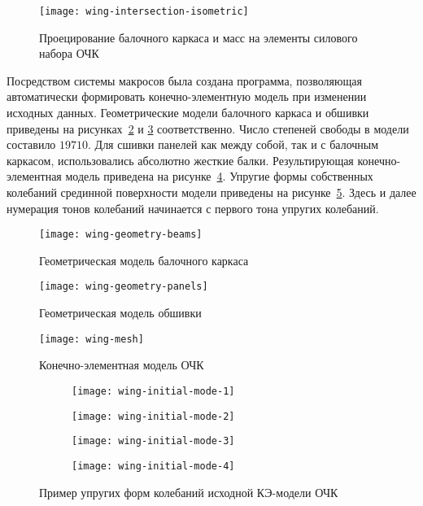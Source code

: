 \begin{figure}[!htb]
	\centerfloat
	\texttt{[image: wing-intersection-isometric]}
	\caption{Проецирование балочного каркаса и масс на элементы силового набора ОЧК} \label{wing-intersection-isometric}
\end{figure}

Посредством системы макросов  была создана программа, позволяющая автоматически формировать конечно-элементную модель при изменении исходных данных. Геометрические модели балочного каркаса и обшивки приведены на рисунках~\ref{fig:wing-geometry-beams} и \ref{fig:wing-geometry-panels} соответственно. Число степеней свободы в модели составило $ 19710 $. Для сшивки панелей как между собой, так и с балочным каркасом, использовались абсолютно жесткие балки. Результирующая конечно-элементная модель приведена на рисунке~\ref{fig:wing-mesh}. Упругие формы собственных колебаний срединной поверхности модели приведены на рисунке~\ref{fig:wing-initial-mode}. Здесь и далее нумерация тонов колебаний начинается с первого тона упругих колебаний. 

\begin{figure}[!htb]
	\centerfloat
	\texttt{[image: wing-geometry-beams]}
	\caption{Геометрическая модель балочного каркаса}\label{fig:wing-geometry-beams}
\end{figure}

\begin{figure}[!htb]
	\centerfloat
	\texttt{[image: wing-geometry-panels]}
	\caption{Геометрическая модель обшивки}\label{fig:wing-geometry-panels}
\end{figure}

\begin{figure}[!htb]
	\centerfloat
	\texttt{[image: wing-mesh]}
	\caption{Конечно-элементная модель ОЧК} \label{fig:wing-mesh}
\end{figure}

\def\sfWing{0.48\textwidth}

\begin{figure}[!htb]
	\centering
	\begin{subfigure}[t]{\sfWing}
		\centering
		\texttt{[image: wing-initial-mode-1]}
	\end{subfigure}
	\hfill
	\begin{subfigure}[t]{\sfWing}
		\centering
		\texttt{[image: wing-initial-mode-2]}
	\end{subfigure}	
	\begin{subfigure}[t]{\sfWing}
		\centering
		\texttt{[image: wing-initial-mode-3]}
	\end{subfigure}	
	\hfill
	\begin{subfigure}[t]{\sfWing}
		\centering
		\texttt{[image: wing-initial-mode-4]}
	\end{subfigure}	
	\caption{Пример упругих форм колебаний исходной КЭ-модели ОЧК} \label{fig:wing-initial-mode}
\end{figure}

